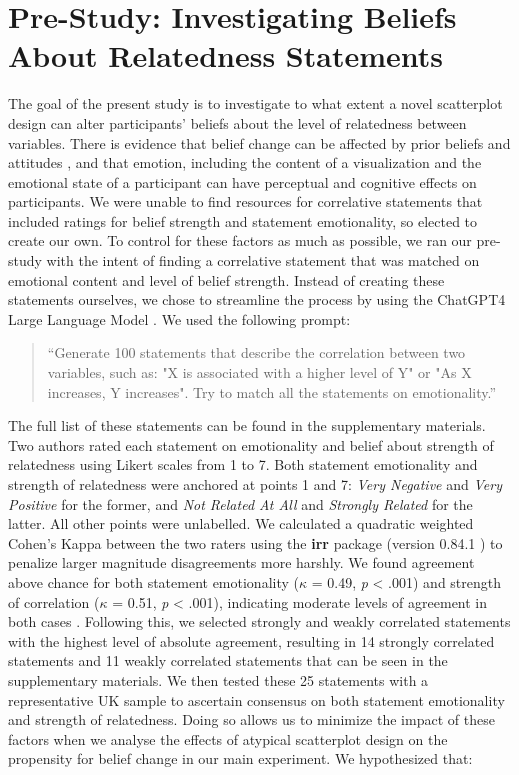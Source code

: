 \documentclass[manuscript,screen,review,anonymous]{acmart}
\begin{document}
\section{Pre-Study: Investigating Beliefs About Relatedness
Statements}\label{sec-pre-study}

The goal of the present study is to investigate to what extent a novel
scatterplot design can alter participants' beliefs about the level of
relatedness between variables. There is evidence that belief change can
be affected by prior beliefs and attitudes
\citep{xiong_2022, markant_2023}, and that emotion, including the
content of a visualization \citep{phelps_2006, harrison_2013} and the
emotional state of a participant \citep{thoresen_2016} can have
perceptual and cognitive effects on participants. We were unable to find
resources for correlative statements that included ratings for belief
strength and statement emotionality, so elected to create our own. To
control for these factors as much as possible, we ran our pre-study with
the intent of finding a correlative statement that was matched on
emotional content and level of belief strength. Instead of creating
these statements ourselves, we chose to streamline the process by using
the ChatGPT4 Large Language Model \citep{chat_gpt}. We used the
following prompt:

\begin{quotation}
    ``Generate 100 statements that describe the correlation between two variables, such as:
     "X is associated with a higher level of Y" or
     "As X increases, Y increases".
    Try to match all the statements on emotionality.''
    
\end{quotation}

The full list of these statements can be found in the supplementary
materials. Two authors rated each statement on emotionality and belief
about strength of relatedness using Likert scales from 1 to 7. Both
statement emotionality and strength of relatedness were anchored at
points 1 and 7: \emph{Very Negative} and \emph{Very Positive} for the
former, and \emph{Not Related At All} and \emph{Strongly Related} for
the latter. All other points were unlabelled. We calculated a quadratic
weighted Cohen's Kappa between the two raters using the \textbf{irr}
package (version 0.84.1 \citep{irr}) to penalize larger magnitude
disagreements more harshly. We found agreement above chance for both
statement emotionality (\(\kappa\) = 0.49, \emph{p} \textless{} .001)
and strength of correlation (\(\kappa\) = 0.51, \emph{p} \textless{}
.001), indicating moderate levels of agreement in both cases
\citep{cohen_1968, fleiss_1969}. Following this, we selected strongly
and weakly correlated statements with the highest level of absolute
agreement, resulting in 14 strongly correlated statements and 11 weakly
correlated statements that can be seen in the supplementary materials.
We then tested these 25 statements with a representative UK sample to
ascertain consensus on both statement emotionality and strength of
relatedness. Doing so allows us to minimize the impact of these factors
when we analyse the effects of atypical scatterplot design on the
propensity for belief change in our main experiment. We hypothesized
that:
\end{document}
